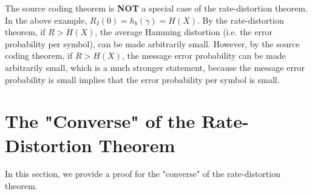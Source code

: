 \documentclass[../main.tex]{subfiles}
\begin{document}
\begin{remark}
    The source coding theorem is \textbf{NOT} a special case of the rate-distortion theorem. 
    \newline
    In the above example, $R_I(0)=h_b(\gamma)=H(X)$. By the rate-distortion theorem, if $R>H(X)$, the average Hamming distortion (i.e. the error probability per symbol), can be made arbitrarily small. 
    \newline
    However, by the source coding theorem, if $R>H(X)$, the message error probability can be made arbitrarily small, which is a much stronger statement, because the message error probability is small implies that the error probability per symbol is small.
\end{remark}
\section{The "Converse" of the Rate-Distortion Theorem}
In this section, we provide a proof for the "converse" of the rate-distortion theorem.
\end{document}
